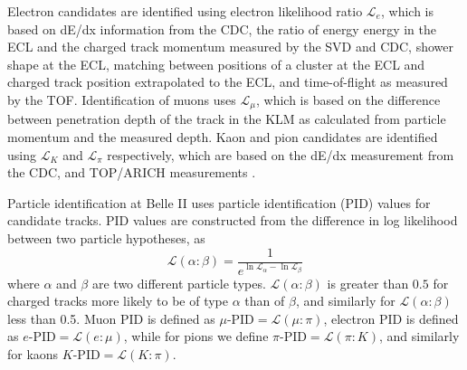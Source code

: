 \documentclass[12pt]{thesis}  %
\begin{document}
Electron candidates are identified using electron likelihood ratio $\mathcal{L}_e$, which is based on dE/dx information from the CDC, the ratio of energy energy in the ECL and the charged track momentum measured by the SVD and CDC, shower shape at the ECL, matching between positions of a cluster at the ECL and charged track position extrapolated to the ECL, and time-of-flight as measured by the TOF. Identification of muons uses $\mathcal{L}_{\mu}$, which is based on the difference between penetration depth of the track in the KLM as calculated from particle momentum and the measured depth. Kaon and pion candidates are identified using $\mathcal{L}_{K}$ and $\mathcal{L}_{\pi}$ respectively, which are based on the dE/dx measurement from the CDC, and TOP/ARICH measurements \cite{BelleII:tech-design-report}.

Particle identification at Belle II uses particle identification (PID) values for candidate tracks. PID values are constructed from the difference in log likelihood between two particle hypotheses, as
\begin{equation}
\mathcal{L}(\alpha : \beta) = \frac{1}{e^{\ln \mathcal{L}_{\alpha}-\ln\mathcal{L}_{\beta}}}
\end{equation}
where $\alpha$ and $\beta$ are two different particle types. $\mathcal{L}(\alpha : \beta)$ is greater than $0.5$ for charged tracks more likely to be of type $\alpha$ than of $\beta$, and similarly for $\mathcal{L}(\alpha : \beta)$ less than 0.5. Muon PID is defined as $\mu\text{-PID}=\mathcal{L}(\mu:\pi)$, electron PID is defined as $e\text{-PID}=\mathcal{L}(e:\mu)$, while for pions we define $\pi\text{-PID}=\mathcal{L}(\pi:K)$, and similarly for kaons $K\text{-PID}=\mathcal{L}(K:\pi)$.
\end{document}
